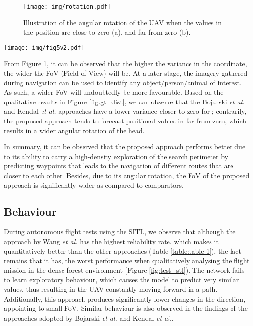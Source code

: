 \documentclass[letterpaper, 10 pt, journal, twoside]{IEEEtran}
\newcommand{\etal}{\emph{et al.}}
\begin{document}
\begin{figure}
    \centering
    \texttt{[image: img/rotation.pdf]}
    \vspace{-0.5cm}
    \caption{Illustration of the angular rotation of the UAV when the values in the  position are close to zero (a), and far from zero (b).}
    \label{fig:fov}\vspace{-0.5cm}
\end{figure}

 
 

 \begin{figure*}
    \centering
\texttt{[image: img/fig5v2.pdf]}
    \vspace{-0.5cm}
    \caption{Comparison of each approach when autonomously flying under the canopy of a dense forest, over a snowy mountain and over a plain field.}
    \label{fig:test_stl}\vspace{-0.5cm}
\end{figure*}

 
 From Figure \ref{fig:fov}, it can be observed that the higher the variance in the  coordinate, the wider the FoV (Field of View) will be. At a later stage, the imagery gathered during navigation can be used to identify any object/person/animal of interest. As such, a wider FoV will undoubtedly be more favourable. Based on the qualitative results in Figure \ref{fig:gt_dist}, we can observe that the Bojarski \etal \cite{bojarski2016end} and Kendal \etal \cite{kendall2015posenet} approaches have a lower variance closer to zero for ; contrarily, the proposed approach tends to forecast positional values in  far from zero, which results in a wider angular rotation of the head.

In summary, it can be observed that the proposed approach performs better due to its ability to carry a high-density exploration of the search perimeter by predicting waypoints that leads to the navigation of different routes that are closer to each other. Besides, due to its angular rotation, the FoV of the proposed approach is significantly wider as compared to comparators.

\subsection{Behaviour}
 

During autonomous flight tests using the SITL, we observe that although the approach by Wang \etal  \cite{wang2017deepvo} has the highest reliability rate, which makes it quantitatively better than the other approaches (Table \ref{table:table-1}), the fact remains that it has, the worst performance when qualitatively analysing the flight mission in the dense forest environment (Figure \ref{fig:test_stl}). The network fails to learn exploratory behaviour, which causes the model to predict very similar values, thus resulting in the UAV constantly moving forward in a path. Additionally, this approach \cite{wang2017deepvo} produces significantly lower changes in the  direction, appointing to small FoV. Similar behaviour is also observed in the findings of the approaches adopted by Bojarski \etal \cite{bojarski2016end} and Kendal \etal \cite{kendall2015posenet}.
\end{document}
